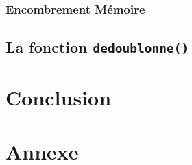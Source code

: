 \documentclass{article}
\newcommand{\info}{\texttt}
\begin{document}
        \subsubsection{Encombrement Mémoire}
        
    \subsection{La fonction \info{dedoublonne()}}
    \label{dedoublonne}
    
        
\section{Conclusion}


\newpage
\appendix
\section*{Annexe}


\newpage
\tableofcontents
\end{document}
